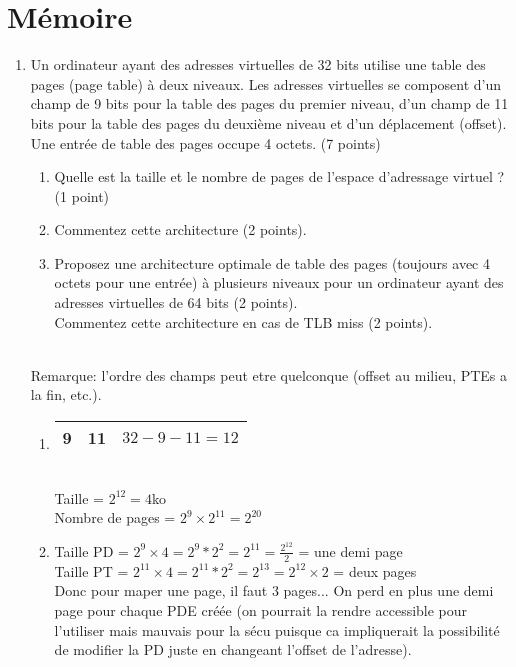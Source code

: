 \section{{Mémoire}
         {\hfill{} }}

\begin{enumerate}

\item Un ordinateur ayant des adresses virtuelles de 32 bits utilise une table des pages (page table) à deux niveaux. Les adresses virtuelles se composent d'un champ de 9 bits pour la table des pages du premier niveau, d'un champ de 11 bits pour la table des pages du deuxième niveau et d'un déplacement (offset). Une entrée de table des pages occupe 4 octets. (7 points)
  \begin{enumerate}
  \item Quelle est la taille et le nombre de pages de l'espace d'adressage virtuel ? (1 point)
  \item Commentez cette architecture (2 points).
  \item Proposez une architecture optimale de table des pages (toujours avec 4 octets pour une entrée) à plusieurs niveaux pour un ordinateur ayant des adresses virtuelles de 64 bits (2 points). \\
  Commentez cette architecture en cas de TLB miss (2 points).
  \end{enumerate}

\begin{correction}\\
Remarque: l’ordre des champs peut etre quelconque (offset au milieu, PTEs a la fin, etc.).
\begin{enumerate}[label=(\alph*)]
  \item \begin{tabular}{|c|c|c|} \hline 9 & 11 & $32-9-11=12$\tabularnewline \hline \end{tabular} \\
        Taille = $2^{12}=4$ko \\
        Nombre de pages = $2^{9}\times2^{11}=2^{20}$

  \item Taille PD = $2^{9}\times4=2^{9}*2^{2}=2^{11}=\frac{2^{12}}{2}$ = une demi page\\
        Taille PT = $2^{11}\times4=2^{11}*2^{2}=2^{13}=2^{12}\times2$ = deux pages\\
        Donc pour maper une page, il faut 3 pages... On perd en plus une demi
        page pour chaque PDE créée (on pourrait la rendre accessible pour
        l’utiliser mais mauvais pour la sécu puisque ca impliquerait la
        possibilité de modifier la PD juste en changeant l’offset de
        l’adresse).


\end{enumerate}
\end{correction}
\end{enumerate}
